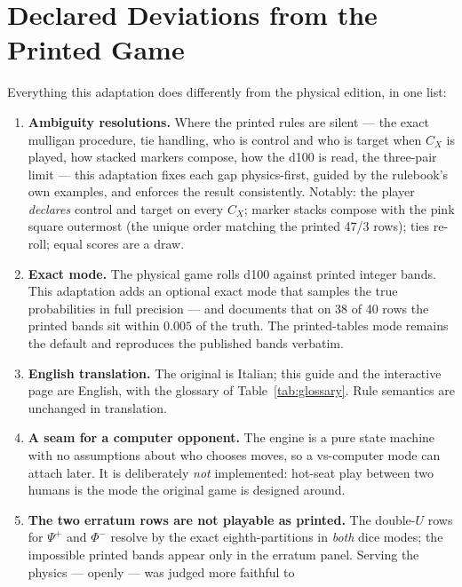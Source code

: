 \documentclass[a4paper,11pt]{article}
\begin{document}
\section{Declared Deviations from the Printed Game}
\label{sec:deviations}

Everything this adaptation does differently from the physical edition, in one list:

\begin{enumerate}
    \item \textbf{Ambiguity resolutions.} Where the printed rules are silent --- the
          exact mulligan procedure, tie handling, who is control and who is target when
          $C_X$ is played, how stacked markers compose, how the d100 is read, the
          three-pair limit --- this adaptation fixes each gap physics-first, guided by
          the rulebook's own examples, and enforces the result consistently. Notably: the
          player \emph{declares} control and target on every $C_X$; marker stacks
          compose with the pink square outermost (the unique order matching the printed
          47/3 rows); ties re-roll; equal scores are a draw.
    \item \textbf{Exact mode.} The physical game rolls d100 against printed integer
          bands. This adaptation adds an optional exact mode that samples the true
          probabilities in full precision --- and documents that on 38 of 40 rows the
          printed bands sit within $0.005$ of the truth. The printed-tables mode remains
          the default and reproduces the published bands verbatim.
    \item \textbf{English translation.} The original is Italian; this guide and the
          interactive page are English, with the glossary of Table~\ref{tab:glossary}.
          Rule semantics are unchanged in translation.
    \item \textbf{A seam for a computer opponent.} The engine is a pure state machine
          with no assumptions about who chooses moves, so a vs-computer mode can attach
          later. It is deliberately \emph{not} implemented: hot-seat play between two
          humans is the mode the original game is designed around.
    \item \textbf{The two erratum rows are not playable as printed.} The double-$U$
          rows for $\Psi^+$ and $\Phi^-$ resolve by the exact eighth-partitions in
          \emph{both} dice modes; the impossible printed bands appear only in the
          erratum panel. Serving the physics --- openly --- was judged more faithful to

\end{enumerate}
\end{document}
